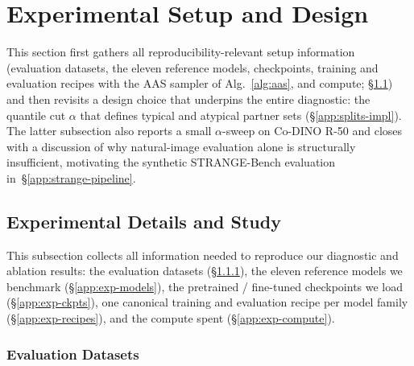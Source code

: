 \section{Experimental Setup and Design}
\label{app:exp-setup}

This section first gathers all reproducibility-relevant setup information (evaluation datasets, the eleven reference models, checkpoints, training and evaluation recipes with the AAS sampler of Alg.~\ref{alg:aas}, and compute; \S\ref{app:experimental-details}) and then revisits a design choice that underpins the entire diagnostic: the quantile cut $\alpha$ that defines typical and atypical partner sets (\S\ref{app:splits-impl}). The latter subsection also reports a small $\alpha$-sweep on Co-DINO R-50 and closes with a discussion of why natural-image evaluation alone is structurally insufficient, motivating the synthetic STRANGE-Bench evaluation in~\S\ref{app:strange-pipeline}.%

\subsection{Experimental Details and Study}\label{app:experimental-details}

This subsection collects all information needed to reproduce our diagnostic and ablation results: the evaluation datasets (\S\ref{app:exp-datasets}), the eleven reference models we benchmark (\S\ref{app:exp-models}), the pretrained / fine-tuned checkpoints we load (\S\ref{app:exp-ckpts}), one canonical training and evaluation recipe per model family (\S\ref{app:exp-recipes}), and the compute spent (\S\ref{app:exp-compute}).

\subsubsection{Evaluation Datasets}\label{app:exp-datasets}

